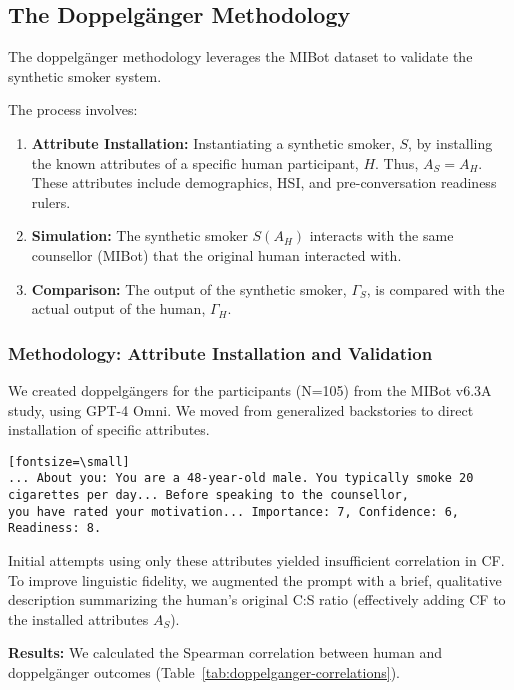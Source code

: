 \subsection{The Doppelgänger Methodology}

The doppelgänger methodology leverages the MIBot dataset to validate the synthetic smoker system.

The process involves:
\begin{enumerate}
    \item \textbf{Attribute Installation:} Instantiating a synthetic smoker, $S$, by installing the known attributes of a specific human participant, $H$. Thus, $A_S = A_H$. These attributes include demographics, HSI, and pre-conversation readiness rulers.
    \item \textbf{Simulation:} The synthetic smoker $S(A_H)$ interacts with the same counsellor (MIBot) that the original human interacted with.
    \item \textbf{Comparison:} The output of the synthetic smoker, $\Gamma_S$, is compared with the actual output of the human, $\Gamma_H$.
\end{enumerate}

\subsubsection{Methodology: Attribute Installation and Validation}

We created doppelgängers for the participants (N=105) from the MIBot v6.3A study, using GPT-4 Omni. We moved from generalized backstories to direct installation of specific attributes.

\begin{verbatim}[fontsize=\small]
... About you: You are a 48-year-old male. You typically smoke 20
cigarettes per day... Before speaking to the counsellor,
you have rated your motivation... Importance: 7, Confidence: 6, Readiness: 8.
\end{verbatim}

Initial attempts using only these attributes yielded insufficient correlation in CF. To improve linguistic fidelity, we augmented the prompt with a brief, qualitative description summarizing the human's original C:S ratio (effectively adding CF to the installed attributes $A_S$).

\textbf{Results:} We calculated the Spearman correlation between human and doppelgänger outcomes (Table~\ref{tab:doppelganger-correlations}).

